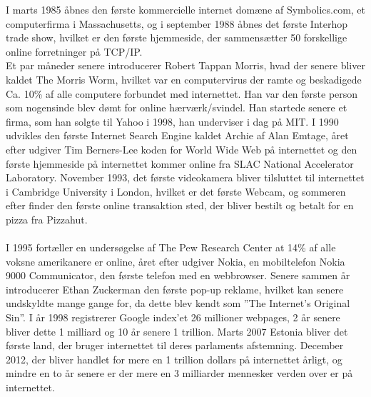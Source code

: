     I marts 1985 åbnes den første kommercielle internet domæne af Symbolics.com, et computerfirma i Massachusetts, og
    i september 1988 åbnes det første Interhop trade show, hvilket er den første hjemmeside, der sammensætter 50 forskellige online forretninger på TCP/IP.\\
    Et par måneder senere introducerer Robert Tappan Morris, hvad der senere bliver kaldet The Morris Worm, hvilket var en computervirus der ramte og beskadigede Ca. 10\% af alle computere forbundet med internettet. Han var den første person som nogensinde blev dømt for online hærværk/svindel. Han startede senere et firma, som han solgte til Yahoo i 1998, han underviser i dag på MIT. I 1990 udvikles den første Internet Search Engine kaldet Archie af Alan Emtage, året efter udgiver Tim Berners-Lee koden for World Wide Web på internettet og den første hjemmeside på internettet kommer online fra SLAC National Accelerator Laboratory. November 1993, det første videokamera bliver tilsluttet til internettet i Cambridge University i London, hvilket er det første Webcam, og sommeren efter finder den første online transaktion sted, der bliver bestilt og betalt for en pizza fra Pizzahut.\\\\
    I 1995 fortæller en undersøgelse af The Pew Research Center at 14\% af alle voksne amerikanere er online, året efter udgiver Nokia, en mobiltelefon Nokia 9000 Communicator, den første telefon med en webbrowser. Senere sammen år introducerer Ethan Zuckerman den første pop-up reklame, hvilket kan senere undskyldte mange gange for, da dette blev kendt som ”The Internet’s Original Sin”. I år 1998 registrerer Google index’et 26 millioner webpages, 2 år senere bliver dette 1 milliard og 10 år senere 1 trillion. Marts 2007 Estonia bliver det første land, der bruger internettet til deres parlaments afstemning. December 2012, der bliver handlet for mere en 1 trillion dollars på internettet årligt, og mindre en to år senere er der mere en 3 milliarder mennesker verden over er på internettet.\autocite{gilpress2015}\\

